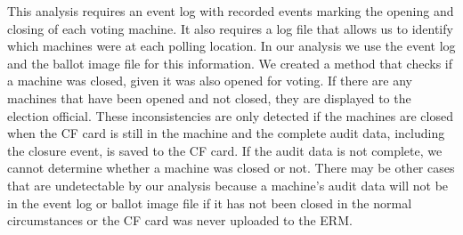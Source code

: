 This analysis requires an event log with recorded events marking the
opening and closing of each voting machine. It also requires a log
file that allows us to identify which machines were at each polling
location. In our analysis we use the event log and the ballot image
file for this information. We created a method that checks if a
machine was closed, given it was also opened for voting.  
If there are any machines that have been opened and not
closed, they are displayed to the election official.  These
inconsistencies are only detected if the machines are closed when the
CF card is still in the machine and the complete audit data, including
the closure event, is saved to the CF card.  If the audit data is not
complete, we cannot determine whether a machine was closed or not.
There may be other cases that are undetectable by our analysis because
a machine's audit data will not be in the event log or ballot image
file if it has not been closed in the normal circumstances or the CF
card was never uploaded to the ERM.  
